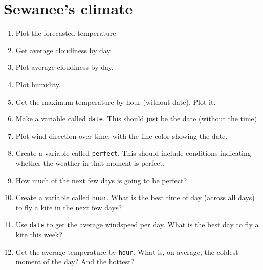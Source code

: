 \documentclass[
]{book}
\newenvironment{Shaded}{\begin{snugshade}}{\end{snugshade}}
\newcommand{\DataTypeTok}[1]{\textcolor[rgb]{0.13,0.29,0.53}{#1}}
\newcommand{\KeywordTok}[1]{\textcolor[rgb]{0.13,0.29,0.53}{\textbf{#1}}}
\newcommand{\NormalTok}[1]{#1}
\newcommand{\OperatorTok}[1]{\textcolor[rgb]{0.81,0.36,0.00}{\textbf{#1}}}
\newcommand{\StringTok}[1]{\textcolor[rgb]{0.31,0.60,0.02}{#1}}
\begin{document}
\hypertarget{sewanees-climate}{%
\chapter{Sewanee's climate}\label{sewanees-climate}}

\begin{Shaded}
\end{Shaded}

\begin{enumerate}
\def\labelenumi{\arabic{enumi}.}
\item
  Plot the forecasted temperature
\item
  Get average cloudiness by day.
\item
  Plot average cloudiness by day.
\item
  Plot humidity.
\item
  Get the maximum temperature by hour (without date). Plot it.
\item
  Make a variable called \texttt{date}. This should just be the date (without the time)
\item
  Plot wind direction over time, with the line color showing the date.
\item
  Create a variable called \texttt{perfect}. This should include conditions indicating whether the weather in that moment is perfect.
\item
  How much of the next few days is going to be perfect?
\item
  Create a variable called \texttt{hour}. What is the best time of day (across all days) to fly a kite in the next few days?
\item
  Use \texttt{date} to get the average windspeed per day. What is the best day to fly a kite this week?
\item
  Get the average temperature by \texttt{hour}. What is, on average, the coldest moment of the day? And the hottest?
\end{enumerate}
\end{document}
